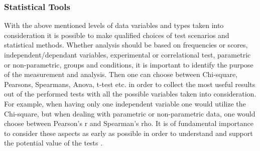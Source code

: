 \subsubsection{Statistical Tools}
With the above mentioned levels of data variables and types taken into consideration it is possible to make qualified choices of test scenarios and statistical methods. Whether analysis should be based on frequencies or scores, independent/dependant variables, experimental or correlational test, parametric or non-parametric, groups and conditions, it is important to identify the purpose of the measurement and analysis. Then one can choose between Chi-square, Pearsons, Spearmans, Anova, t-test etc. in order to collect the most useful results out of the performed tests with all the possible variables taken into consideration. For example, when having only one independent variable one would utilize the Chi-square, but when dealing with parametric or non-parametric data, one would choose between Pearson’s r and Spearman’s rho. It is of fundamental importance to consider these aspects as early as possible in order to understand and support the potential value of the tests \citep[page 274]{Design}.
